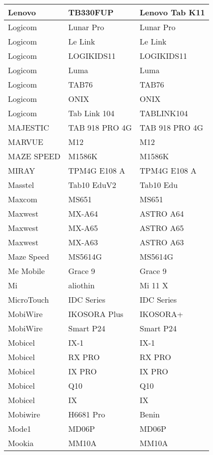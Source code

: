 \begin{tabularx}{\linewidth}{|l|X|X|}
        Lenovo & TB330FUP & Lenovo Tab K11 \\ \hline
        Logicom & Lunar Pro & Lunar Pro \\ \hline
        Logicom & Le Link & Le Link \\ \hline
        Logicom & LOGIKIDS11 & LOGIKIDS11 \\ \hline
        Logicom & Luma & Luma \\ \hline
        Logicom & TAB76 & TAB76 \\ \hline
        Logicom & ONIX & ONIX \\ \hline
        Logicom & Tab Link 104 & TABLINK104 \\ \hline
        MAJESTIC & TAB 918 PRO 4G & TAB 918 PRO 4G \\ \hline
        MARVUE & M12 & M12 \\ \hline
        MAZE SPEED & M1586K & M1586K \\ \hline
        MIRAY & TPM4G E108 A & TPM4G E108 A \\ \hline
        Masstel & Tab10 EduV2 & Tab10 Edu \\ \hline
        Maxcom & MS651 & MS651 \\ \hline
        Maxwest & MX-A64 & ASTRO A64 \\ \hline
        Maxwest & MX-A65 & ASTRO A65 \\ \hline
        Maxwest & MX-A63 & ASTRO A63 \\ \hline
        Maze Speed & MS5614G & MS5614G \\ \hline
        Me Mobile & Grace 9 & Grace 9 \\ \hline
        Mi & aliothin & Mi 11 X \\ \hline
        MicroTouch & IDC Series & IDC Series \\ \hline
        MobiWire & IKOSORA Plus & IKOSORA+ \\ \hline
        MobiWire & Smart P24 & Smart P24 \\ \hline
        Mobicel & IX-1 & IX-1 \\ \hline
        Mobicel & RX PRO & RX PRO \\ \hline
        Mobicel & IX PRO & IX PRO \\ \hline
        Mobicel & Q10 & Q10 \\ \hline
        Mobicel & IX & IX \\ \hline
        Mobiwire & H6681 Pro & Benin \\ \hline
        Mode1 & MD06P & MD06P \\ \hline
        Mookia & MM10A & MM10A \\ \hline

\end{tabularx}
